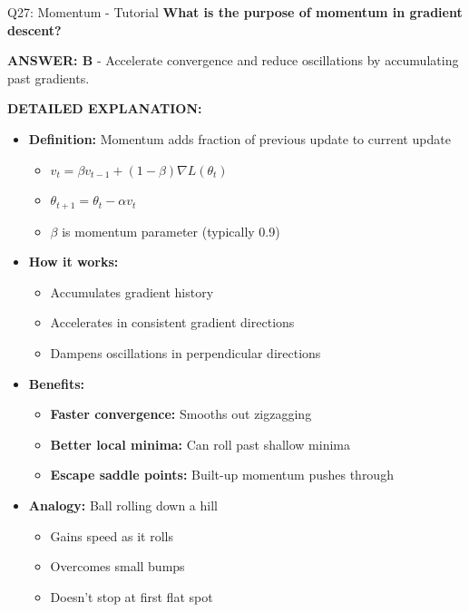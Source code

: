 \documentclass[8pt]{beamer}
\begin{document}
	\begin{frame}{Q27: Momentum - Tutorial}
		\fontsize{6.5}{7.5}\selectfont
		\textbf{What is the purpose of momentum in gradient descent?}
		
		\vspace{0.05cm}
		\textcolor{myblue}{\textbf{ANSWER: B}} - Accelerate convergence and reduce oscillations by accumulating past gradients.
		
		\vspace{0.05cm}
		\textbf{DETAILED EXPLANATION:}
		\begin{itemize}
			\item \textbf{Definition:} Momentum adds fraction of previous update to current update
			\begin{itemize}
				\item $v_t = \beta v_{t-1} + (1-\beta)\nabla L(\theta_t)$
				\item $\theta_{t+1} = \theta_t - \alpha v_t$
				\item $\beta$ is momentum parameter (typically 0.9)
			\end{itemize}
			\item \textbf{How it works:}
			\begin{itemize}
				\item Accumulates gradient history
				\item Accelerates in consistent gradient directions
				\item Dampens oscillations in perpendicular directions
			\end{itemize}
			\item \textbf{Benefits:}
			\begin{itemize}
				\item \textbf{Faster convergence:} Smooths out zigzagging
				\item \textbf{Better local minima:} Can roll past shallow minima
				\item \textbf{Escape saddle points:} Built-up momentum pushes through
			\end{itemize}
			\item \textbf{Analogy:} Ball rolling down a hill
			\begin{itemize}
				\item Gains speed as it rolls
				\item Overcomes small bumps
				\item Doesn't stop at first flat spot
			\end{itemize}
		\end{itemize}
		

\end{frame}
\end{document}
